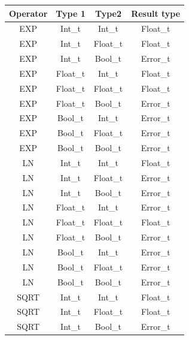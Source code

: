 \begin{figure}[H]
    \centering
    \begin{tabular}{cccc}
        \toprule
        \textbf{Operator} & \textbf{Type 1} & \textbf{Type2} & \textbf{Result type}\\
        \midrule EXP & Int\_t & Int\_t      & Float\_t \\
        \midrule EXP & Int\_t & Float\_t    & Float\_t \\
        \midrule EXP & Int\_t & Bool\_t     & Error\_t \\

        \midrule EXP & Float\_t & Int\_t    & Float\_t \\
        \midrule EXP & Float\_t & Float\_t  & Float\_t \\
        \midrule EXP & Float\_t & Bool\_t   & Error\_t \\

        \midrule EXP & Bool\_t & Int\_t     & Error\_t \\
        \midrule EXP & Bool\_t & Float\_t   & Error\_t \\
        \midrule EXP & Bool\_t & Bool\_t    & Error\_t \\

        \midrule LN & Int\_t & Int\_t      & Float\_t \\
        \midrule LN & Int\_t & Float\_t    & Error\_t \\
        \midrule LN & Int\_t & Bool\_t     & Error\_t \\

        \midrule LN & Float\_t & Int\_t    & Error\_t \\
        \midrule LN & Float\_t & Float\_t  & Float\_t \\
        \midrule LN & Float\_t & Bool\_t   & Error\_t \\

        \midrule LN & Bool\_t & Int\_t     & Error\_t \\
        \midrule LN & Bool\_t & Float\_t   & Error\_t \\
        \midrule LN & Bool\_t & Bool\_t    & Error\_t \\

        \midrule SQRT & Int\_t & Int\_t      & Float\_t \\
        \midrule SQRT & Int\_t & Float\_t    & Float\_t \\
        \midrule SQRT & Int\_t & Bool\_t     & Error\_t \\


\end{tabular}
\end{figure}
